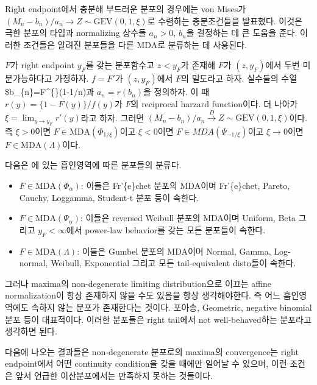 \documentclass[b5paper,]{scrbook}
\theoremstyle{plain}
\theoremstyle{definition}
\numberwithin{equation}{section}
\let\BeginKnitrBlock\begin \let\EndKnitrBlock\end
\begin{document}
Right endpoint에서 충분해 부드러운 분포의 경우에는 von Mises가 \((M_{n}-b_{n})/a_{n}\rightarrow Z \sim \text{GEV}(0,1,\xi)\)로 수렴하는 충분조건들을 발표했다. 이것은 극한 분포의 타입과 normalizing 상수들 \(a_{n}>0\), \(b_{n}\)을 결정하는 데 큰 도움을 준다. 이러한 조건들은 알려진 분포들을 다른 MDA로 분류하는 데 사용된다.

\BeginKnitrBlock{proposition}[von Mises conditions]
\protect\hypertarget{prp:unnamed-chunk-433}{}{\label{prp:unnamed-chunk-433} {} }\(F\)가 right endpoint \(y_{F}\)를 갖는 분포함수고 \(z<y_{F}\)가 존재해 \(F\)가 \((z,y_{F})\)에서 두번 미분가능하다고 가정하자. \(f=F'\)가 \((z,y_{F})\)에서 \(F\)의 밀도라고 하자. 실수들의 수열 \$b\_\{n\}=F\^{}\{\leftarrow\}(1-1/n)과 \(a_{n}=r(b_{n})\)을 정의하자. 이 때 \(r(y)=\{1-F(y)\}/f(y)\)가 \(F\)의 reciprocal harzard function이다. 더 나아가 \(\xi=\lim_{y\rightarrow y_{F}}r'(y)\)라고 하자. 그러면 \((M_{n}-b_{n})/a_{n}\stackrel{D}{\rightarrow} Z\sim \text{GEV}(0,1,\xi)\)이다. 즉 \(\xi>0\)이면 \(F\in \text{MDA}(\Phi_{1/\xi})\)이고 \(\xi<0\)이면 \(F\in MDA(\Psi_{-1/\xi})\)이고 \(\xi\rightarrow 0\)이면 \(F\in \text{MDA}(\Lambda)\)이다.
\EndKnitrBlock{proposition}

다음은 \citep{Huser2013}에 있는 흡인영역에 따른 분포들의 분류다.

\begin{itemize}
\item
  \(F\in\text{MDA}(\Phi_{\alpha})\): 이들은 Fr'\{e\}chet 분포의 MDA이며 Fr'\{e\}chet, Pareto, Cauchy, Loggamma, Student-t 분포 등이 속한다.
\item
  \(F\in\text{MDA}(\Psi_{\alpha})\): 이들은 reversed Weibull 분포의 MDA이며 Uniform, Beta 그리고 \(y_{F}<\infty\)에서 power-law behavior를 갖는 모든 분포들이 속한다.
\item
  \(F\in\text{MDA}(\Lambda)\): 이들은 Gumbel 분포의 MDA이며 Normal, Gamma, Log-normal, Weibull, Exponential 그리고 모든 tail-equivalent distn들이 속한다.
\end{itemize}

그러나 maxima의 non-degenerate limiting distribution으로 이끄는 affine normalization이 항상 존재하지 않을 수도 있음을 항상 생각해야한다. 즉 어느 흡인영역에도 속하지 않는 분포가 존재한다는 것이다. 포아송, Geometric, negative binomial 분포 등이 대표적이다. 이러한 분포들은 right tail에서 not well-behaved하는 분포라고 생각하면 된다.

다음에 나오는 결과들은 non-degenerate 분포로의 maxima의 convergence는 right endpoint에서 어떤 continuity condition을 갖을 때에만 일어날 수 있으며, 이런 조건은 앞서 언급한 이산분포에서는 만족하지 못하는 것들이다.
\end{document}
